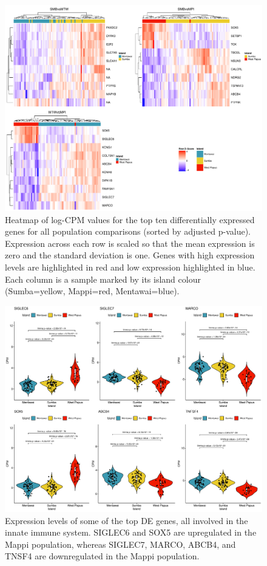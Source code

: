 \documentclass[12pt,a4paper,titlepage,twoside,openright]{book}
\begin{document}
\begin{mainmatter}
{{\begin{figure}[htb!]
\centering
\includegraphics[width=\textwidth,height=\textheight,keepaspectratio]{Figures/HeatmapAllPops_dupCor.pdf}
\caption{Heatmap of log-CPM values for the top ten differentially expressed genes for all population comparisons (sorted by adjusted p-value). Expression across each row is scaled so that the mean expression is zero and the standard deviation is one. Genes with high expression levels are highlighted in red and low expression highlighted in blue. Each column is a sample marked by its island colour (Sumba=yellow, Mappi=red, Mentawai=blue).}
\label{fig:Heatmap Top Genes}
\end{figure}

\begin{figure}[htb!]
\centering
\includegraphics[width=\textwidth,height=\textheight,keepaspectratio]{Figures/favouriteTopGenes_distribution_Island.pdf}
\caption{Expression levels of some of the top DE genes, all involved in the innate immune system. SIGLEC6 and SOX5 are upregulated in the Mappi population, whereas SIGLEC7, MARCO, ABCB4, and TNSF4 are downregulated in the Mappi population.}
\label{fig:Heatmap Top Genes}
\end{figure}

}}
\end{mainmatter}
\end{document}

